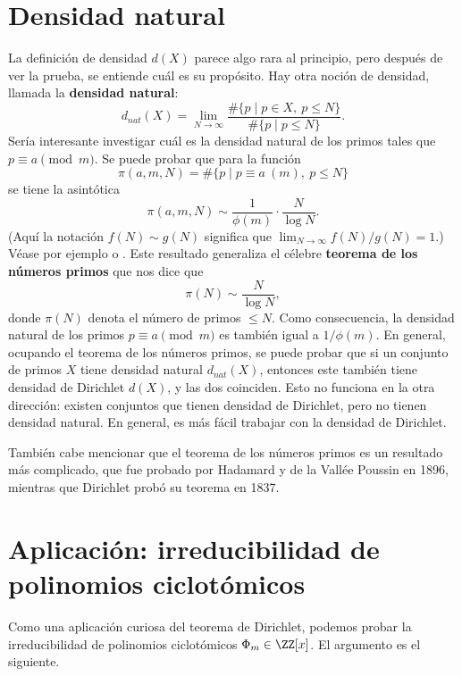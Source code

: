 
\section{Densidad natural}

La definición de densidad $d (X)$ parece algo rara al principio, pero después
de ver la prueba, se entiende cuál es su propósito. Hay otra noción de densidad,
llamada la \textbf{densidad natural}:
$$d_{nat} (X) = \lim_{N\to\infty} \frac{\# \{ p \mid p\in X, ~ p \le N \}}{\# \{ p \mid p \le N \}}.$$
Sería interesante investigar cuál es la densidad natural de los primos tales que
$p \equiv a \pmod{m}$. Se puede probar que para la función
$$\pi (a,m,N) = \# \{ p \mid p \equiv a ~ (m), ~ p \le N \}$$
se tiene la asintótica
$$\pi (a,m,N) \sim \frac{1}{\phi (m)}\cdot \frac{N}{\log N}.$$
(Aquí la notación $f (N) \sim g (N)$ significa que
$\lim_{N\to\infty} f(N)/g(N) = 1$.) Véase por ejemplo
\cite[Chapter~7]{Everiste-ANT} o
\cite[Chapter~6]{Hlawka-Taschner-Schoissengeier}.
Este resultado generaliza el célebre \textbf{teorema de los números primos}
que nos dice que
$$\pi (N) \sim \frac{N}{\log N},$$
donde $\pi (N)$ denota el número de primos $\le N$. Como consecuencia,
la densidad natural de los primos $p \equiv a \pmod{m}$ es también igual a
$1/\phi(m)$. En general, ocupando el teorema de los números primos, se puede
probar que si un conjunto de primos $X$ tiene densidad natural $d_{nat} (X)$,
entonces este también tiene densidad de Dirichlet $d (X)$, y las dos coinciden.
Esto no funciona en la otra dirección: existen conjuntos que tienen densidad
de Dirichlet, pero no tienen densidad natural. En general, es más fácil trabajar
con la densidad de Dirichlet.

También cabe mencionar que el teorema de los números primos es un resultado más
complicado, que fue probado por Hadamard y de la Vallée Poussin en 1896,
mientras que Dirichlet probó su teorema en 1837.


\section{Aplicación: irreducibilidad de polinomios ciclotómicos}

Como una aplicación curiosa del teorema de Dirichlet, podemos probar
la irreducibilidad de polinomios ciclotómicos $\Phi_m \in \ZZ [x]$. El argumento
es el siguiente.

